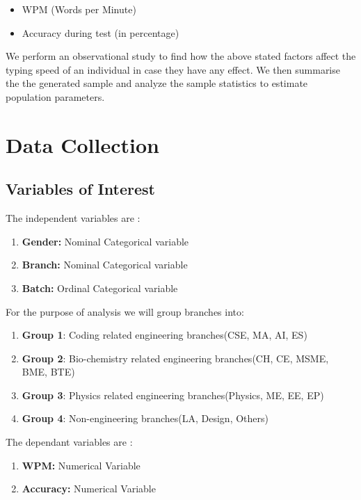 \documentclass[12pt,a4paper]{report}
\begin{document}
\begin{itemize}
    \item WPM (Words per Minute)
    \item Accuracy during test (in percentage)
\end{itemize}
     

We perform an observational study to find how the above stated factors affect the typing speed of an individual in case they have any effect. We then summarise the the generated sample and analyze the sample statistics to estimate population parameters. 


\newpage
\section*{\Huge{Data Collection}}

\subsection*{\LARGE{Variables of Interest}}

The independent variables are :
\begin{enumerate}
    \item \textbf{Gender: } Nominal Categorical variable
    \item \textbf{Branch: } Nominal Categorical variable
    \item \textbf{Batch: } Ordinal Categorical variable
\end{enumerate}

\noindent For the purpose of analysis we will group branches into:
\begin{enumerate}
    \item \textbf{Group 1}: Coding related engineering branches(CSE, MA, AI, ES) 
    \item \textbf{Group 2}: Bio-chemistry related engineering branches(CH, CE, MSME, BME, BTE)
    \item \textbf{Group 3}: Physics related engineering branches(Physics, ME, EE, EP)
    \item \textbf{Group 4}: Non-engineering branches(LA, Design, Others)
\end{enumerate}

\noindent The dependant variables are :

\begin{enumerate}
    \item \textbf{WPM: } Numerical Variable
    \item \textbf{Accuracy: } Numerical Variable
\end{enumerate}
\end{document}
